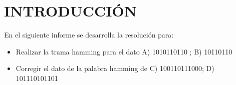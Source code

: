 \section{INTRODUCCIÓN}
\sangria{} En el siguiente informe se desarrolla la resolución para:
\begin{itemize}[nosep]
    \item Realizar la trama hamming para el dato A) 1010110110 ; B) 10110110

    \item Corregir el dato de la palabra hamming de C) 100110111000; D) 101110101101
\end{itemize}

